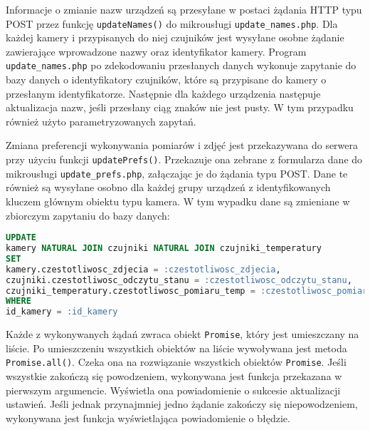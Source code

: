 \documentclass[a4paper,11pt,twoside]{article}
\begin{document}
Informacje o zmianie nazw urządzeń są przesyłane w postaci żądania HTTP typu POST przez funkcję \texttt{updateNames()} do mikrousługi \texttt{update{\_}names.php}. Dla każdej kamery i przypisanych do niej czujników jest wysyłane osobne żądanie zawierające wprowadzone nazwy oraz identyfikator kamery. Program \texttt{update{\_}names.php} po zdekodowaniu przesłanych danych wykonuje zapytanie do bazy danych o identyfikatory czujników, które są przypisane do kamery o przesłanym identyfikatorze. Następnie dla każdego urządzenia następuje aktualizacja nazw, jeśli przesłany ciąg znaków nie jest pusty. W tym przypadku również użyto parametryzowanych zapytań.

Zmiana preferencji wykonywania pomiarów i zdjęć jest przekazywana do serwera przy użyciu funkcji \texttt{updatePrefs()}. Przekazuje ona zebrane z formularza dane do mikrousługi \texttt{update{\_}prefs.php}, załączając je do żądania typu POST. Dane te również są wysyłane osobno dla każdej grupy urządzeń z identyfikowanych kluczem głównym obiektu typu kamera. W tym wypadku dane są zmieniane w zbiorczym zapytaniu do bazy danych:
\begin{lstlisting}[language=SQL]
UPDATE 
kamery NATURAL JOIN czujniki NATURAL JOIN czujniki_temperatury 
SET 
kamery.czestotliwosc_zdjecia = :czestotliwosc_zdjecia, 
czujniki.czestotliwosc_odczytu_stanu = :czestotliwosc_odczytu_stanu,
czujniki_temperatury.czestotliwosc_pomiaru_temp = :czestotliwosc_pomiaru_temp
WHERE 
id_kamery = :id_kamery
\end{lstlisting}

Każde z wykonywanych żądań zwraca obiekt \texttt{Promise}, który jest umieszczany na liście. Po umieszczeniu wszystkich obiektów na liście wywoływana jest metoda \texttt{Promise.all()}. Czeka ona na rozwiązanie wszystkich obiektów \texttt{Promise}. Jeśli wszystkie zakończą się powodzeniem, wykonywana jest funkcja przekazana w pierwszym argumencie. Wyświetla ona powiadomienie o sukcesie aktualizacji ustawień. Jeśli jednak przynajmniej jedno żądanie zakończy się niepowodzeniem, wykonywana jest funkcja wyświetlająca powiadomienie o błędzie.
\end{document}
